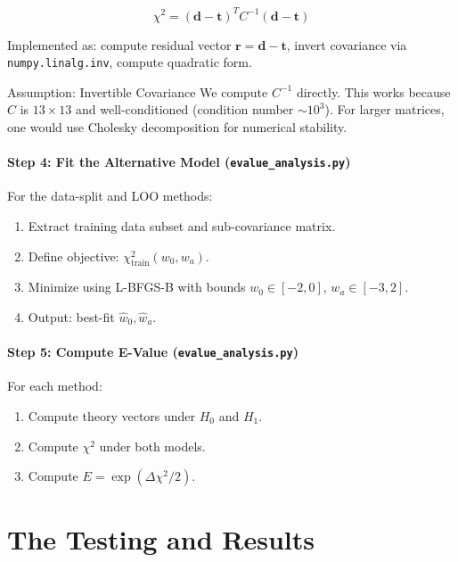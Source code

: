 \documentclass[11pt,a4paper]{article}
\begin{document}
\begin{equation}
\chi^2 = (\mathbf{d} - \mathbf{t})^T C^{-1} (\mathbf{d} - \mathbf{t})
\end{equation}

Implemented as: compute residual vector $\mathbf{r} = \mathbf{d} - \mathbf{t}$, invert covariance via \texttt{numpy.linalg.inv}, compute quadratic form.

\begin{warningbox}{Assumption: Invertible Covariance}
We compute $C^{-1}$ directly. This works because $C$ is $13 \times 13$ and well-conditioned (condition number $\sim 10^3$). For larger matrices, one would use Cholesky decomposition for numerical stability.
\end{warningbox}

\subsection{Step 4: Fit the Alternative Model (\texttt{evalue\_analysis.py})}

For the data-split and LOO methods:
\begin{enumerate}
    \item Extract training data subset and sub-covariance matrix.
    \item Define objective: $\chi^2_{\text{train}}(w_0, w_a)$.
    \item Minimize using L-BFGS-B with bounds $w_0 \in [-2, 0]$, $w_a \in [-3, 2]$.
    \item Output: best-fit $\hat{w}_0, \hat{w}_a$.
\end{enumerate}

\subsection{Step 5: Compute E-Value (\texttt{evalue\_analysis.py})}

For each method:
\begin{enumerate}
    \item Compute theory vectors under $H_0$ and $H_1$.
    \item Compute $\chi^2$ under both models.
    \item Compute $E = \exp(\Delta\chi^2 / 2)$.
\end{enumerate}


\part{The Testing and Results}
\end{document}
